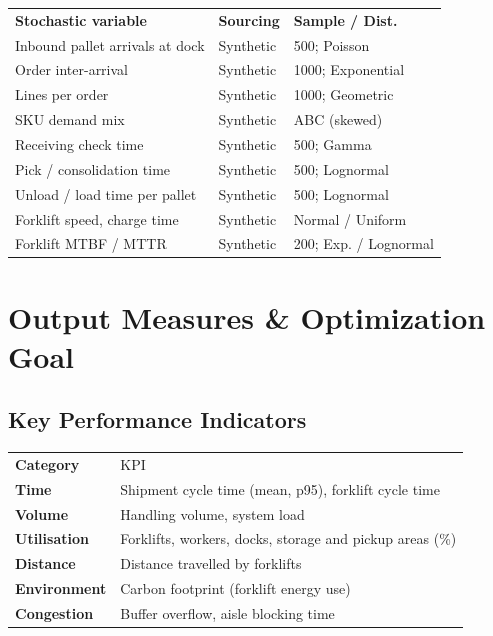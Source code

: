 \documentclass[10pt]{selfArx}
\begin{document}
{\small
\renewcommand{\arraystretch}{1.12}
\setlength{\tabcolsep}{3pt}
\noindent\begin{tabularx}{\columnwidth}{LP{1.35cm}P{2.6cm}}
 \textbf{Stochastic variable} & \textbf{Sourcing} & \textbf{Sample / Dist.} \\
Inbound pallet arrivals at dock & Synthetic & 500; Poisson \\
Order inter-arrival            & Synthetic & 1000; Exponential \\
Lines per order                 & Synthetic & 1000; Geometric \\
SKU demand mix                  & Synthetic & ABC (skewed) \\
Receiving check time            & Synthetic & 500; Gamma \\
Pick / consolidation time       & Synthetic & 500; Lognormal \\
Unload / load time per pallet   & Synthetic & 500; Lognormal \\
Forklift speed, charge time     & Synthetic & Normal / Uniform \\
Forklift MTBF / MTTR            & Synthetic & 200; Exp. / Lognormal \\
\end{tabularx}}

\section{Output Measures \& Optimization Goal}

\subsection*{Key Performance Indicators}
{\small
\renewcommand{\arraystretch}{1.12}
\setlength{\tabcolsep}{3pt}
\noindent\begin{tabularx}{\columnwidth}{>{\bfseries}P{1.8cm}L}
 Category & KPI \\
Time        & Shipment cycle time (mean, p95), forklift cycle time \\
Volume      & Handling volume, system load \\
Utilisation & Forklifts, workers, docks, storage and pickup areas (\%) \\
Distance    & Distance travelled by forklifts \\
Environment & Carbon footprint (forklift energy use) \\
Congestion  & Buffer overflow, aisle blocking time \\
\end{tabularx}}
\end{document}
